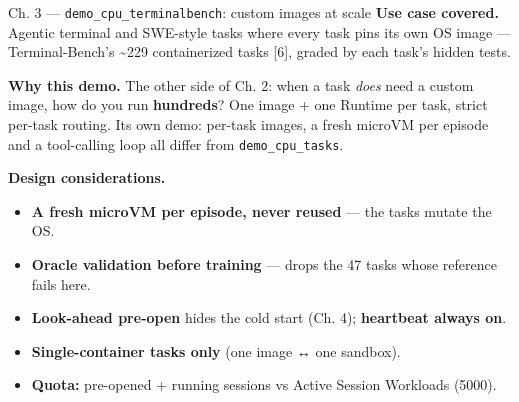 \documentclass[
  10pt,
  ignorenonframetext,
  aspectratio=169,
  t]{beamer}
\providecommand{\tightlist}{%
  \setlength{\itemsep}{0pt}\setlength{\parskip}{0pt}}
\begin{document}
\begin{frame}{Ch. 3 --- \texttt{demo\_cpu\_terminalbench}:
custom images at scale}
\protect\hypertarget{ch.-3-demo_cpu_terminalbench-custom-images-at-scale}{}
\textbf{Use case covered.} Agentic terminal and SWE-style tasks where
every task pins its own OS image --- Terminal-Bench's \textasciitilde229
containerized tasks {[}6{]}, graded by each task's hidden tests.

\textbf{Why this demo.} The other side of Ch. 2: when a task \emph{does}
need a custom image, how do you run \textbf{hundreds}? One image + one
Runtime per task, strict per-task routing. Its own demo: per-task
images, a fresh microVM per episode and a tool-calling loop all differ
from \texttt{demo\_cpu\_tasks}.

\textbf{Design considerations.}

\begin{itemize}
\tightlist
\item
  \textbf{A fresh microVM per episode, never reused} --- the tasks
  mutate the OS.
\item
  \textbf{Oracle validation before training} --- drops the 47 tasks
  whose reference fails here.
\item
  \textbf{Look-ahead pre-open} hides the cold start (Ch. 4);
  \textbf{heartbeat always on}.
\item
  \textbf{Single-container tasks only} (one image ↔ one sandbox).
\item
  \textbf{Quota:} pre-opened + running sessions vs Active Session
  Workloads (5000).
\end{itemize}
\end{frame}
\end{document}
